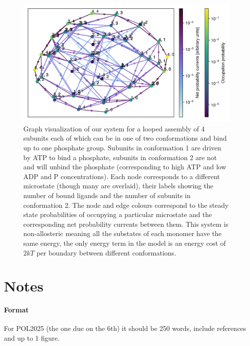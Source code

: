 \documentclass[11pt]{article}
\begin{document}
\vspace{1em}

\printbibliography

\vspace{1em}

\begin{figure}[H]
	\centering
	\includegraphics[width=\textwidth]{../../plots/aaa_B=1_C=2_N=4_version=2.5.png}
    \caption{
        Graph visualization of our system for a looped assembly of 4 subunits each of which can be in one of two conformations and bind up to one phosphate group.
        Subunits in conformation 1 are driven by ATP to bind a phosphate, subunits in conformation 2 are not and will unbind the phosphate (corresponding to high ATP and low ADP and P concentrations).
        Each node corresponds to a different microstate (though many are overlaid), their labels showing the number of bound ligands and the number of subunits in conformation 2.
        The node and edge colours correspond to the steady state probabilities of occupying a particular microstate and the corresponding net probability currents between them.
        This system is non-allosteric meaning all the substates of each monomer have the same energy, the only energy term in the model is an energy cost of $2\si{k}T$ per boundary between different conformations.
    }\label{fig:loop}
\end{figure}

\newpage
\section{Notes}
\paragraph{Format}
For POL2025 (the one due on the 6th) it should be 250 words, include references and up to 1 figure.
\end{document}
